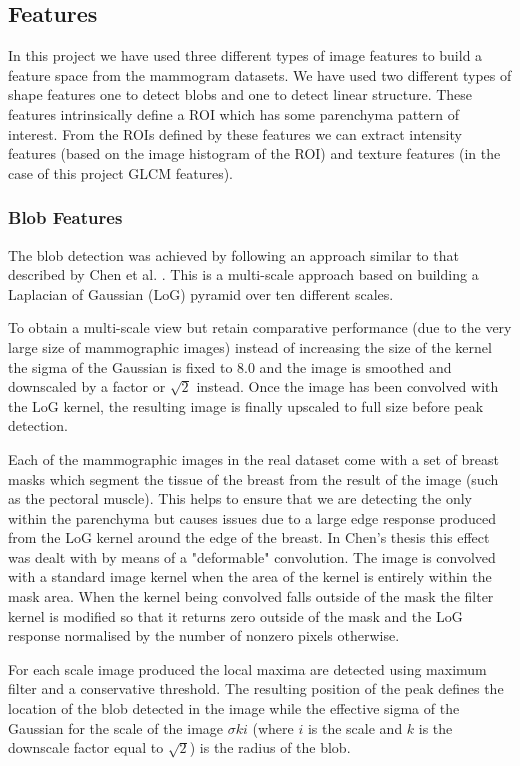 \subsection{Features}
\label{sec:features}
In this project we have used three different types of image features to build a feature space from the mammogram datasets. We have used two different types of shape features one to detect blobs and one to detect linear structure. These features intrinsically define a ROI which has some parenchyma pattern of interest. From the ROIs defined by these features we can extract intensity features (based on the image histogram of the ROI) and texture features (in the case of this project GLCM features).

\subsubsection{Blob Features}
The blob detection was achieved by following an approach similar to that described by Chen et al. \cite{chen2013multiscale, chen2013mammographic}. This is a multi-scale approach based on building a Laplacian of Gaussian (LoG) pyramid over ten different scales. 

To obtain a multi-scale view but retain comparative performance (due to the very large size of mammographic images) instead of increasing the size of the kernel the sigma of the Gaussian is fixed to 8.0 and the image is smoothed and downscaled by a factor or $\sqrt{2}$ instead. Once the image has been convolved with the LoG kernel, the resulting image is finally upscaled to full size before peak detection.

Each of the mammographic images in the real dataset come with a set of breast masks which segment the tissue of the breast from the result of the image (such as the pectoral muscle). This helps to ensure that we are detecting the only within the parenchyma but causes issues due to a large edge response produced from the LoG kernel around the edge of the breast. In Chen's thesis this effect was dealt with by means of a "deformable" convolution. The image is convolved with a standard image kernel when the area of the kernel is entirely within the mask area. When the kernel being convolved falls outside of the mask the filter kernel is modified so that it returns zero outside of the mask and the LoG response normalised by the number of nonzero pixels otherwise.

For each scale image produced the local maxima are detected using maximum filter and a conservative threshold. The resulting position of the peak defines the location of the blob detected in the image while the effective sigma of the Gaussian for the scale of the image $\sigma k i$ (where $i$ is the scale and $k$ is the downscale factor equal to $\sqrt{2}$) is the radius of the blob.

